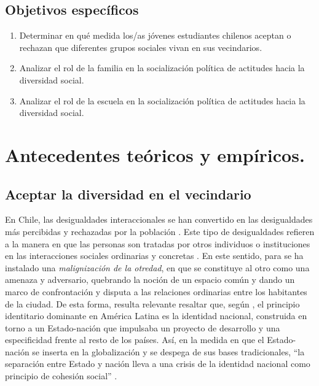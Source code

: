 \documentclass[12pt,twoside]{templates/facsothesis}
\begin{document}
\hypertarget{objetivos-especuxedficos}{%
\section{Objetivos específicos}\label{objetivos-especuxedficos}}

\begin{enumerate}
\def\labelenumi{\arabic{enumi}.}
\item
  Determinar en qué medida los/as jóvenes estudiantes chilenos aceptan o rechazan que diferentes grupos sociales vivan en sus vecindarios.
\item
  Analizar el rol de la familia en la socialización política de actitudes hacia la diversidad social.
\item
  Analizar el rol de la escuela en la socialización política de actitudes hacia la diversidad social.
\end{enumerate}

\hypertarget{antecedentes-teuxf3ricos-y-empuxedricos.}{%
\chapter{Antecedentes teóricos y empíricos.}\label{antecedentes-teuxf3ricos-y-empuxedricos.}}

\hypertarget{aceptar-la-diversidad-en-el-vecindario}{%
\section{Aceptar la diversidad en el vecindario}\label{aceptar-la-diversidad-en-el-vecindario}}

En Chile, las desigualdades interaccionales se han convertido en las desigualdades más percibidas y rechazadas por la población \citep{araujo_igualdad_2013}. Este tipo de desigualdades refieren a la manera en que las personas son tratadas por otros individuos o instituciones en las interacciones sociales ordinarias y concretas \citep{araujo_percepcion_2019}. En este sentido, para \citet{araujo_percepcion_2019} se ha instalado una \emph{malignización de la otredad}, en que se constituye al otro como una amenaza y adversario, quebrando la noción de un espacio común y dando un marco de confrontación y disputa a las relaciones ordinarias entre los habitantes de la ciudad. De esta forma, resulta relevante resaltar que, según \citet{castells_globalizacion_2005}, el principio identitario dominante en América Latina es la identidad nacional, construida en torno a un Estado-nación que impulsaba un proyecto de desarrollo y una especificidad frente al resto de los países. Así, en la medida en que el Estado-nación se inserta en la globalización y se despega de sus bases tradicionales, ``la separación entre Estado y nación lleva a una crisis de la identidad nacional como principio de cohesión social'' \citep[p.~40]{castells_globalizacion_2005}.
\end{document}
